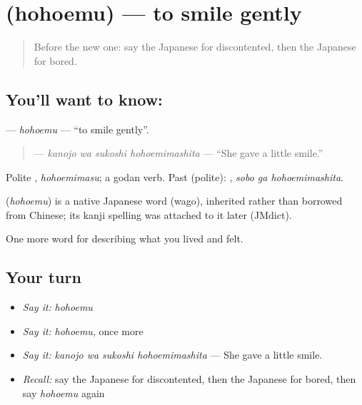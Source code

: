 \section[\texorpdfstring{\ja{ほほえむ} (hohoemu)}{ほほえむ (hohoemu)}]{ (hohoemu) — to smile gently}

\label{lesson:JA-C435-hohoemu}



\begin{quote}
Before the new one: say the Japanese for discontented, then the Japanese for bored.
\end{quote}

\subsection*{You'll want to know: }
\textbf{} — \emph{hohoemu} — \textquotedblleft{}to smile gently\textquotedblright{}.

\begin{quote}
\textbf{  } — \emph{kanojo wa sukoshi hohoemimashita} — \textquotedblleft{}She gave a little smile.\textquotedblright{}
\end{quote}

Polite \textbf{}, \emph{hohoemimasu}; a godan verb. Past (polite): \textbf{ }, \emph{sobo ga hohoemimashita}.

\begin{cousinweb}
\textbf{} (\emph{hohoemu}) is a native Japanese word (wago), inherited rather than borrowed from Chinese; its kanji spelling was attached to it later (JMdict).
\end{cousinweb}

\begin{grammarlens}[title={What you've built}]
One more word for describing what you lived and felt.
\end{grammarlens}

\subsection*{Your turn}
\begin{itemize}
\raggedright
  \item \emph{Say it:} \emph{hohoemu}
  \item \emph{Say it:} \emph{hohoemu}, once more
  \item \emph{Say it:} \emph{kanojo wa sukoshi hohoemimashita} — She gave a little smile.
  \item \emph{Recall:} say the Japanese for discontented, then the Japanese for bored, then say \emph{hohoemu} again
\end{itemize}

